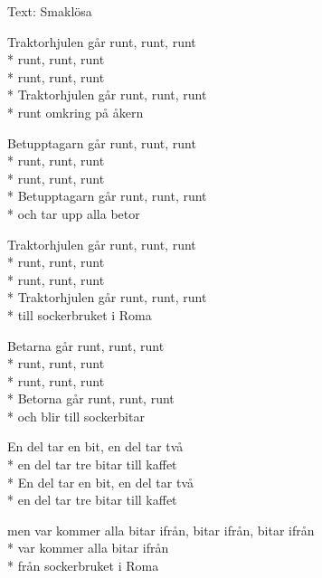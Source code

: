 \begin{SongText}[Traktorhjulen]
\begin{SongInfo}
    Text: Smaklösa
\end{SongInfo}
\begin{SongVerse}
Traktorhjulen går runt, runt, runt\\*%
runt, runt, runt\\*%
runt, runt, runt\\*%
Traktorhjulen går runt, runt, runt\\*%
runt omkring på åkern
\end{SongVerse}
\begin{SongVerse}
Betupptagarn går runt, runt, runt\\*%
runt, runt, runt\\*%
runt, runt, runt\\*%
Betupptagarn går runt, runt, runt\\*%
och tar upp alla betor
\end{SongVerse}
\begin{SongVerse}
Traktorhjulen går runt, runt, runt\\*%
runt, runt, runt\\*%
runt, runt, runt\\*%
Traktorhjulen går runt, runt, runt\\*%
till sockerbruket i Roma
\end{SongVerse}
\begin{SongVerse}
Betarna går runt, runt, runt\\*%
runt, runt, runt\\*%
runt, runt, runt\\*%
Betorna går runt, runt, runt\\*%
och blir till sockerbitar
\end{SongVerse}
\begin{SongVerse}
En del tar en bit, en del tar två\\*%
en del tar tre bitar till kaffet\\*%
En del tar en bit, en del tar två\\*%
en del tar tre bitar till kaffet
\end{SongVerse}
\begin{SongVerse}
men var kommer alla bitar ifrån, bitar ifrån, bitar ifrån\\*%
var kommer alla bitar ifrån\\*%
från sockerbruket i Roma
\end{SongVerse}
\begin{SongVerse}

\end{SongVerse}
\end{SongText}

